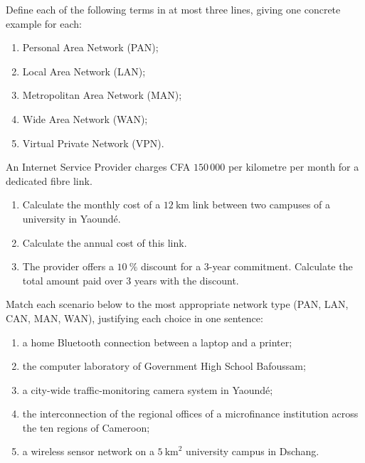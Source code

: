 \documentclass[11pt]{article}
\newcounter{popsec}
\newcounter{popsub}
\newcommand{\courssub}[1]{%
  \stepcounter{popsub}%
  \par\vspace{9pt}\noindent{\popxbold\fontsize{11.5}{13}\selectfont\color{popink}{\color{poporange}\thepopsec.\thepopsub}\hspace{6pt}#1}\par\nopagebreak\vspace{4pt}
}
\begin{document}
\begin{exercice}[Definitions]
Define each of the following terms in at most three lines, giving one concrete example for each:
\begin{enumerate}
\item Personal Area Network (PAN);
\item Local Area Network (LAN);
\item Metropolitan Area Network (MAN);
\item Wide Area Network (WAN);
\item Virtual Private Network (VPN).
\end{enumerate}
\end{exercice}

\begin{exercice}
An Internet Service Provider charges CFA $150\,000$ per kilometre per month for a dedicated fibre link.
\begin{enumerate}
\item Calculate the monthly cost of a $12\ \mathrm{km}$ link between two campuses of a university in Yaoundé.
\item Calculate the annual cost of this link.
\item The provider offers a $10\ \%$ discount for a 3-year commitment. Calculate the total amount paid over 3 years with the discount.
\end{enumerate}
\end{exercice}

\courssub{I practise}

\begin{exercice}
Match each scenario below to the most appropriate network type (PAN, LAN, CAN, MAN, WAN), justifying each choice in one sentence:
\begin{enumerate}
\item a home Bluetooth connection between a laptop and a printer;
\item the computer laboratory of Government High School Bafoussam;
\item a city-wide traffic-monitoring camera system in Yaoundé;
\item the interconnection of the regional offices of a microfinance institution across the ten regions of Cameroon;
\item a wireless sensor network on a $5\ \mathrm{km}^2$ university campus in Dschang.
\end{enumerate}
\end{exercice}
\end{document}
